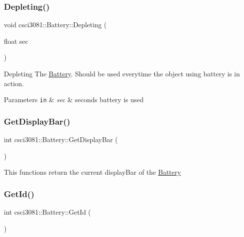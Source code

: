\subsubsection{\texorpdfstring{Depleting()}{Depleting()}}
{\footnotesize\ttfamily void csci3081\+::\+Battery\+::\+Depleting (\begin{DoxyParamCaption}\item[{float}]{sec }\end{DoxyParamCaption})}



Depleting The \hyperlink{classcsci3081_1_1Battery}{Battery}. Should be used everytime the object using battery is in action. 


\begin{DoxyParams}[1]{Parameters}
\mbox{\tt in}  & {\em sec} & seconds battery is used \\
\hline
\end{DoxyParams}
\mbox{\label{classcsci3081_1_1Battery_a68eb2bc2fdd001fa025f44374d6edc69}} 
\subsubsection{\texorpdfstring{Get\+Display\+Bar()}{GetDisplayBar()}}
{\footnotesize\ttfamily int csci3081\+::\+Battery\+::\+Get\+Display\+Bar (\begin{DoxyParamCaption}{ }\end{DoxyParamCaption})}

This functions return the current display\+Bar of the \hyperlink{classcsci3081_1_1Battery}{Battery} \mbox{\label{classcsci3081_1_1Battery_a2ea2113b8dbea215849c5446eb96134e}} 
\subsubsection{\texorpdfstring{Get\+Id()}{GetId()}}
{\footnotesize\ttfamily int csci3081\+::\+Battery\+::\+Get\+Id (\begin{DoxyParamCaption}{ }\end{DoxyParamCaption})}

